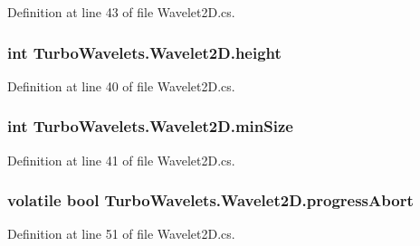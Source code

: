 Definition at line 43 of file Wavelet2\+D.\+cs.

\hypertarget{class_turbo_wavelets_1_1_wavelet2_d_afb2aa87b89b82f329357cbdc0cde18a8}{
\subsubsection[{height}]{\setlength{\rightskip}{0pt plus 5cm}int Turbo\+Wavelets.\+Wavelet2\+D.\+height\hspace{0.3cm}{\ttfamily [protected]}}}\label{class_turbo_wavelets_1_1_wavelet2_d_afb2aa87b89b82f329357cbdc0cde18a8}


Definition at line 40 of file Wavelet2\+D.\+cs.

\hypertarget{class_turbo_wavelets_1_1_wavelet2_d_af5148ef1a46dd5694ccea13aa8f1b9e2}{
\subsubsection[{min\+Size}]{\setlength{\rightskip}{0pt plus 5cm}int Turbo\+Wavelets.\+Wavelet2\+D.\+min\+Size\hspace{0.3cm}{\ttfamily [protected]}}}\label{class_turbo_wavelets_1_1_wavelet2_d_af5148ef1a46dd5694ccea13aa8f1b9e2}


Definition at line 41 of file Wavelet2\+D.\+cs.

\hypertarget{class_turbo_wavelets_1_1_wavelet2_d_adb4984a01d9ab29c0056b18cbbcdef6f}{
\subsubsection[{progress\+Abort}]{\setlength{\rightskip}{0pt plus 5cm}volatile bool Turbo\+Wavelets.\+Wavelet2\+D.\+progress\+Abort\hspace{0.3cm}{\ttfamily [protected]}}}\label{class_turbo_wavelets_1_1_wavelet2_d_adb4984a01d9ab29c0056b18cbbcdef6f}


Definition at line 51 of file Wavelet2\+D.\+cs.

